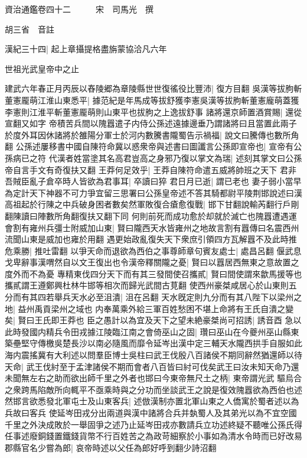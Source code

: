 資治通鑑卷四十二　　　宋　司馬光　撰

胡三省　音註

漢紀三十四|{
	起上章攝提格盡旃蒙協洽凡六年}


世祖光武皇帝中之止

建武六年春正月丙辰以舂陵郷為章陵縣世世復徭役比豐沛|{
	復方目翻}
吳漢等拔胊斬董憲龎萌江淮山東悉平|{
	據范紀是年馬成等拔舒獲李憲吳漢等拔朐斬董憲龐萌蓋獲李憲則江淮平斬董憲龎萌則山東平也拔胊之上逸拔舒事}
諸將還京師置酒賞賜|{
	還從宣翻又如字}
帝積苦兵間以隗囂遣子内侍公孫述遠據邊垂乃謂諸將曰且當置此兩子於度外耳因休諸將於雒陽分軍士於河内數騰書隴蜀告示禍福|{
	說文曰騰傳也數所角翻}
公孫述屢移書中國自陳符命冀以惑衆帝與述書曰圖讖言公孫即宣帝也|{
	宣帝有公孫病已之符}
代漢者姓當塗其名高君豈高之身邪乃復以掌文為瑞|{
	述刻其掌文曰公孫帝自言手文有奇復扶又翻}
王莽何足效乎|{
	王莽自陳符命遣五威將帥班之天下}
君非吾賊臣亂子倉卒時人皆欲為君事耳|{
	卒讀曰猝}
君日月已逝|{
	謂已老也}
妻子弱小當早為定計天下神器不可力爭宜留三思署曰公孫皇帝述不答其騎都尉平陵荆邯說述曰漢高祖起於行陳之中兵破身困者數矣然軍敗復合瘡愈復戰|{
	邯下甘翻說輸芮翻行戶剛翻陳讀曰陣數所角翻復扶又翻下同}
何則前死而成功愈於却就於滅亡也隗囂遭遇運會割有雍州兵彊士附威加山東|{
	賢曰隴西天水皆雍州之地故言割有囂傳曰名震西州流聞山東是威加也雍於用翻}
遇更始政亂復失天下衆庶引領四方瓦解囂不及此時推危乘勝|{
	推吐雷翻}
以爭天命而退欲為西伯之事尊師章句賓友處士|{
	處昌呂翻}
偃武息戈卑辭事漢喟然自以文王復出也令漢帝釋關隴之憂|{
	賢曰以囂居西無東之意故置之度外而不為憂}
專精東伐四分天下而有其三發間使召攜貳|{
	賢曰間使謂來歙馬援等也攜貳謂王遵鄭興杜林牛邯等相次而歸光武間古莧翻}
使西州豪桀咸居心於山東則五分而有其四若舉兵天水必至沮潰|{
	沮在呂翻}
天水旣定則九分而有其八陛下以梁州之地|{
	益州禹貢梁州之域也}
内奉萬乘外給三軍百姓愁困不堪上命將有王氏自潰之變矣|{
	賢曰王氏即王莽也}
臣之愚計以為宜及天下之望未絶豪桀尚可招誘|{
	誘音酉}
急以此時發國内精兵令田戎據江陵臨江南之會倚巫山之固|{
	瓚曰巫山在今夔州巫山縣東}
築壘堅守傳檄吳楚長沙以南必隨風而靡令延岑出漢中定三輔天水隴西拱手自服如此海内震搖冀有大利述以問羣臣博士吳柱曰武王伐殷八百諸侯不期同辭然猶還師以待天命|{
	武王伐紂至于孟津諸侯不期而會者八百皆曰紂可伐矣武王曰汝未知天命乃還}
未聞無左右之助而欲出師千里之外者也邯曰今東帝無尺土之柄|{
	東帝謂光武}
驅烏合之衆跨馬陷敵所向輒平不亟乘時與之分功而坐談武王之說是復效隗囂欲為西伯也述然邯言欲悉發北軍屯士及山東客兵|{
	述倣漢制亦置北軍山東之人僑寓於蜀者述以為兵故曰客兵}
使延岑田戎分出兩道與漢中諸將合兵并埶蜀人及其弟光以為不宜空國千里之外決成敗於一舉固爭之述乃止延岑田戎亦數請兵立功述終疑不聽唯公孫氏得任事述廢銅錢置鐵錢貨幣不行百姓苦之為政苛細察於小事如為清水令時而已好改易郡縣官名少嘗為郎|{
	哀帝時述以父任為郎好呼到翻少詩沼翻}
